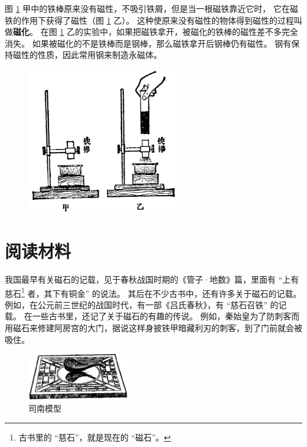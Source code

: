 图 \ref{fig:10-6} 甲中的铁棒原来没有磁性，不吸引铁屑，但是当一根磁铁靠近它时，
它在磁铁的作用下获得了磁性（图 \ref{fig:10-6} 乙）。
这种使原来没有磁性的物体得到磁性的过程叫做\textbf{磁化}。
在图 \ref{fig:10-6} 乙的实验中，如果把磁铁拿开，被磁化的铁棒的磁性差不多完全消失。
如果被磁化的不是铁棒而是钢棒，那么磁铁拿开后钢棒仍有磁性。
钢有保持磁性的性质，因此常用钢来制造永磁体。

\begin{figure}[htbp]
    \centering
    \includegraphics[width=0.6\textwidth]{../pic/czwl2-ch10-6}
    \caption{}\label{fig:10-6}
\end{figure}


\section*{阅读材料}

我国最早有关磁石的记载，见于春秋战国时期的《管子·地数》篇，里面有
“上有慈石\footnote{古书里的 “慈石”，就是现在的 “磁石”。} 者，其下有铜金” 的说法。
其后在不少古书中，还有许多关于磁石的记载。
例如，在公元前三世纪的战国时代，有一部《吕氏春秋》，有 “慈石召铁” 的记载。
在一些古书里，还记了关于磁石的有趣的传说。
例如，秦始皇为了防刺客而用磁石来修建阿房宫的大门，据说这样身披铁甲暗藏利刃的刺客，到了门前就会被吸住。

\begin{figure}[htbp]
    \centering
    \includegraphics[width=0.4\textwidth]{../pic/czwl2-ch10-7}
    \caption{司南模型}\label{fig:10-7}
\end{figure}

